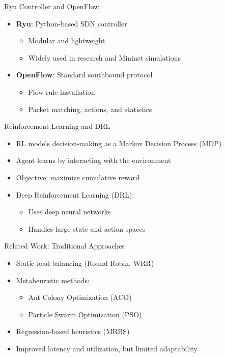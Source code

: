 \documentclass[aspectratio=169]{beamer}
\begin{document}
\begin{frame}{Ryu Controller and OpenFlow}
\begin{itemize}
    \item \textbf{Ryu}: Python-based SDN controller
    \begin{itemize}
        \item Modular and lightweight
        \item Widely used in research and Mininet simulations
    \end{itemize}
    \item \textbf{OpenFlow}: Standard southbound protocol
    \begin{itemize}
        \item Flow rule installation
        \item Packet matching, actions, and statistics
    \end{itemize}
\end{itemize}
\end{frame}

\begin{frame}{Reinforcement Learning and DRL}
\begin{itemize}
    \item RL models decision-making as a Markov Decision Process (MDP)
    \item Agent learns by interacting with the environment
    \item Objective: maximize cumulative reward
    \item Deep Reinforcement Learning (DRL):
    \begin{itemize}
        \item Uses deep neural networks
        \item Handles large state and action spaces
    \end{itemize}
\end{itemize}
\end{frame}

\begin{frame}{Related Work: Traditional Approaches}
\begin{itemize}
    \item Static load balancing (Round Robin, WRR)
    \item Metaheuristic methods:
    \begin{itemize}
        \item Ant Colony Optimization (ACO)
        \item Particle Swarm Optimization (PSO)
    \end{itemize}
    \item Regression-based heuristics (MRBS)
    \item Improved latency and utilization, but limited adaptability
\end{itemize}
\end{frame}
\end{document}
